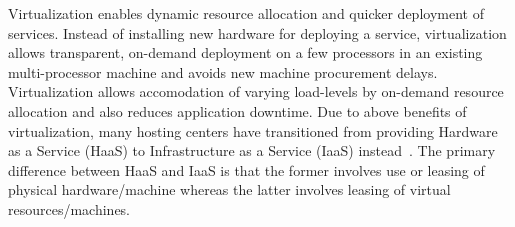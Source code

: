 

Virtualization enables dynamic resource allocation and quicker deployment
of services. Instead of installing new hardware for deploying a service,
virtualization allows transparent, on-demand deployment
on a few
processors in an existing multi-processor machine and avoids new machine
procurement delays. %
Virtualization allows accomodation of varying load-levels by
on-demand resource allocation %
and also reduces application downtime. %
Due to above benefits of virtualization,
many hosting centers have transitioned from providing 
Hardware as a Service (HaaS) to 
Infrastructure as a Service (IaaS) instead~\cite{ec2}.
The primary difference between HaaS and IaaS is that the
former involves use or leasing of physical
hardware/machine whereas the latter involves
leasing of virtual resources/machines.

